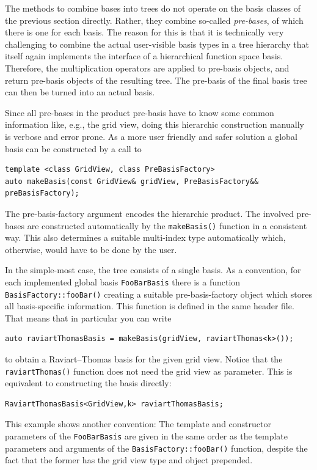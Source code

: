 \documentclass[a4paper,10pt,headings=normal,bibliography=totoc]{scrartcl}
\newcommand{\cpp}[1]{\lstinline[basicstyle=\ttfamily]!#1!}
\begin{document}
The methods to combine bases into trees do not operate on the basis classes of the previous section
directly.  Rather, they combine so-called \emph{pre-bases}, of which there is one for each basis.
The reason for this is
that it is technically very challenging to combine the actual user-visible basis types in a
tree hierarchy that itself again implements the interface of a hierarchical function space basis.
Therefore, the multiplication operators are applied to pre-basis objects, and return pre-basis
objects of the resulting tree.
The pre-basis of the final basis tree can then be turned into an actual basis.

Since all pre-bases in the product pre-basis have to know some common information
like, e.g., the grid view, doing this hierarchic construction
manually is verbose and error prone. As a more user friendly and safer solution
a global basis can be constructed by a call to
\begin{lstlisting}[style=Interface]
template <class GridView, class PreBasisFactory>
auto makeBasis(const GridView& gridView, PreBasisFactory&& preBasisFactory);
\end{lstlisting}
The pre-basis-factory argument encodes the hierarchic product.
The involved pre-bases are constructed automatically by the
\cpp{makeBasis()} function in a consistent way.
This also determines a suitable multi-index type automatically
which, otherwise, would have to be done by the user.

In the simple-most case, the tree consists of a single basis.
As a convention, for each implemented global basis
\cpp{FooBarBasis} there is a function \cpp{BasisFactory::fooBar()}
creating a suitable pre-basis-factory object which
stores all basis-specific information.
This function is defined in the same header file.
That means that in particular you can write
\begin{lstlisting}[style=Example]
auto raviartThomasBasis = makeBasis(gridView, raviartThomas<k>());
\end{lstlisting}
to obtain a Raviart--Thomas basis for the given grid view.
Notice that the \cpp{raviartThomas()} function does not need
the grid view as parameter.
This is equivalent to constructing
the basis directly:
\begin{lstlisting}[style=Example]
RaviartThomasBasis<GridView,k> raviartThomasBasis;
\end{lstlisting}
This example shows another convention: The template and constructor parameters
of the \cpp{FooBarBasis} are given in the same order as the template
parameters and arguments of the \cpp{BasisFactory::fooBar()} function,
despite the fact that the former has the grid view type and object prepended.
\end{document}
